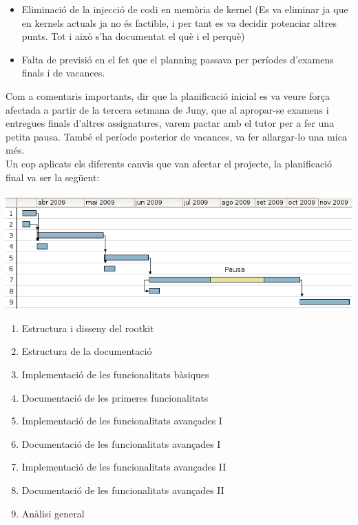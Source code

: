 \begin{itemize}
    \item Eliminació de la injecció de codi en memòria de kernel (Es va eliminar ja que en kernels actuals ja no 
        és factible, i per tant es va decidir potenciar altres punts. Tot i això s'ha documentat el què i el perquè)
    \item Falta de previsió en el fet que el planning passava per períodes d'examens finals i de vacances.
\end{itemize}

Com a comentaris importants, dir que la planificació inicial es va veure força afectada a partir de la tercera setmana de Juny, que al apropar-se
examens i entregues finals d'altres assignatures, varem pactar amb el tutor per a fer una petita pausa. També el període posterior
de vacances, va fer allargar-lo una mica més. \\

Un cop aplicats els diferents canvis que van afectar el projecte, la planificació final va ser la següent: \\
\\
\includegraphics[scale=0.68,keepaspectratio]{segon_gantt.png} 

\begin{enumerate}
    \item Estructura i disseny del rootkit
    \item Estructura de la documentació
    \item Implementació de les funcionalitats bàsiques
    \item Documentació de les primeres funcionalitats
    \item Implementació de les funcionalitats avançades I
    \item Documentació de les funcionalitats avançades I
    \item Implementació de les funcionalitats avançades II
    \item Documentació de les funcionalitats avançades II
    \item Anàlisi general
\end{enumerate}

